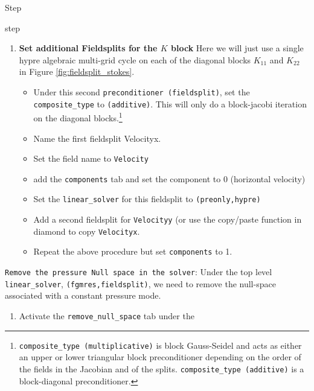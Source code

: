 \begin{steps}{Step}
\begin{steps}{step}
\begin{enumerate}
\begin{itemize}
      \item add the field \texttt{Velocity}
        \item Set the linear solver to \texttt{fgmres} with
          \texttt{restart} 30, \texttt{relative\_error} 1.e-3,
          \texttt{max\_iterations} 1
        \item Set the preconditioner to \texttt{fieldsplit}
      \end{itemize}
    \item \textbf{Set additional Fieldsplits for the $K$ block} Here
      we will just use a single hypre algebraic multi-grid cycle on
      each of the diagonal blocks $K_{11}$ and $K_{22}$ in Figure \ref{fig:fieldsplit_stokes}.
      \begin{itemize}
      \item Under this second \texttt{preconditioner (fieldsplit)},
        set the \texttt{composite\_type} to \texttt{(additive)}.  This
        will only do a block-jacobi iteration on the diagonal blocks.\footnote{
        \texttt{composite\_type (multiplicative)} is block
        Gauss-Seidel and acts as either an upper or lower triangular
        block preconditioner depending on the order of the fields in
        the Jacobian and of the splits. \texttt{composite\_type
          (additive)} is a block-diagonal preconditioner.}
      \item Name the first fieldsplit Velocityx.
      \item Set the field name to \texttt{Velocity}
      \item add the \texttt{components} tab and set the component to 0
        (horizontal velocity)
      \item Set the \texttt{linear\_solver} for this fieldsplit to
        \texttt{(preonly,hypre)}
      \item Add a second fieldsplit for \texttt{Velocityy} (or use the
        copy/paste function in diamond to copy \texttt{Velocityx}.
      \item Repeat the above procedure but set \texttt{components} to 1.
      \end{itemize}
    \end{enumerate}
  \item \texttt{Remove the pressure Null space in the solver}: Under
    the top level \texttt{linear\_solver}, \texttt{(fgmres,fieldsplit)}, we need
    to remove the null-space associated with a constant pressure mode.
    \begin{enumerate}
    \item Activate the \texttt{remove\_null\_space} tab under the

\end{enumerate}
\end{steps}
\end{steps}
